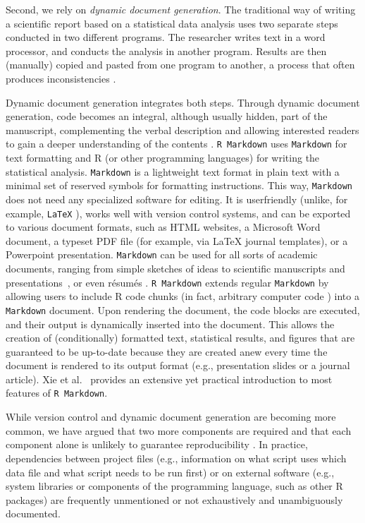\documentclass[psych,tutorial,accept,moreauthors,pdftex]{Definitions/mdpi}
\begin{document}
Second, we rely on \emph{dynamic document generation}. The traditional
way of writing a scientific report based on a statistical data analysis
uses two separate steps conducted in two different programs. The
researcher writes text in a word processor, and conducts the analysis in
another program. Results are then (manually) copied and pasted from one
program to another, a process that often produces inconsistencies
\citep{nuijtenPrevalenceStatisticalReporting2016}.

Dynamic document generation integrates both steps. Through dynamic
document generation, code becomes an integral, although usually hidden,
part of the manuscript, complementing the verbal description and
allowing interested readers to gain a deeper understanding of the
contents
\citep{knuthCWEBSystemStructured, claerboutElectronicDocumentsGive1992}.
\texttt{R\ Markdown} uses \texttt{Markdown} for text formatting and R
(or other programming languages) for writing the statistical analysis.
\texttt{Markdown} is a lightweight text format in plain text with a
minimal set of reserved symbols for formatting instructions. This way,
\texttt{Markdown} does not need any specialized software for editing. It
is userfriendly (unlike, for example, \texttt{LaTeX}
\citep{lamportLATEXDocumentPreparation1994}), works well with version
control systems, and can be exported to various document formats, such
as HTML websites, a Microsoft Word document, a typeset PDF file (for
example, via LaTeX journal templates), or a Powerpoint presentation.
\texttt{Markdown} can be used for all sorts of academic documents,
ranging from simple sketches of ideas to scientific manuscripts
\citep{R-rticles} and presentations~\citep{revealjs}, or even résumés
\citep{vitae}. \texttt{R\ Markdown} extends regular \texttt{Markdown} by
allowing users to include R code chunks (in fact, arbitrary computer
code \citep[Chapter 15, Chapter 15, Other
Languages]{xieMarkdownCookbook2020}) into a \texttt{Markdown} document.
Upon rendering the document, the code blocks are executed, and their
output is dynamically inserted into the document. This allows the
creation of (conditionally) formatted text, statistical results, and
figures that are guaranteed to be up-to-date because they are created
anew every time the document is rendered to its output format (e.g.,
presentation slides or a journal article).
Xie et al.~\citep{xieMarkdownCookbook2020} provides an extensive yet practical
introduction to most features of \texttt{R\ Markdown}.

While version control and dynamic document generation are becoming more
common, we have argued that two more components are required and that
each component alone is unlikely to guarantee reproducibility
\citep{Peikert2019, vanlissa2020worcs}. In practice, dependencies
between project files (e.g., information on what script uses which data
file and what script needs to be run first) or on external software
(e.g., system libraries or components of the programming language, such
as other R packages) are frequently unmentioned or not exhaustively and
unambiguously documented.
\end{document}

